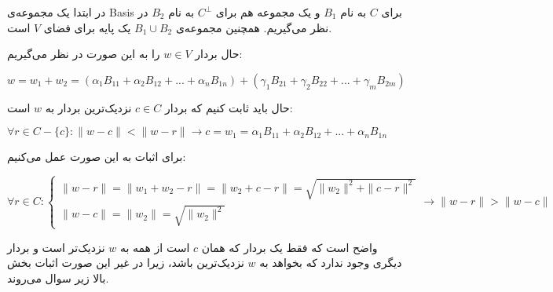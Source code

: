 در ابتدا یک مجموعه‌ی Basis برای $C$ به نام 
$B_1$
و یک مجموعه هم برای
$C^{\bot}$
به نام 
$B_2$
در نظر می‌گیریم. همچنین مجموعه‌ی 
$B_1 \cup B_2$
یک پایه برای فضای $V$ است.

حال بردار 
$w \in V$
را به این صورت در نظر می‌گیریم:

\setLTR

$w = w_1 + w_2 =( \alpha_1B_{11}+\alpha_2B_{12}+...+\alpha_nB_{1n}) + (\gamma_1B_{21} +\gamma_2B_{22}+ ...+\gamma_mB_{2m})$

\setRTL

حال باید ثابت کنیم که بردار 
$c \in C$
نزدیک‌‌‌ترین بردار به $w$ است:

\setLTR

$\forall r \in C - \{c\}: \|w-c\| < \|w-r\| \longrightarrow c = w_1 = \alpha_1B_{11}+\alpha_2B_{12}+...+\alpha_nB_{1n}$

\setRTL

برای اثبات به این صورت عمل می‌کنیم:

\setLTR

$
\forall r \in C:
\begin{cases}
	 \|w-r\| = \|w_1 + w_2 - r \| = \| w_2 + c - r \| = \sqrt{\|w_2\|^2 + \| c-r\|^2} \\
	\|w-c\| = \|w_2\| = \sqrt{\|w_2\|^2}
\end{cases}
\longrightarrow \|w-r\| > \|w-c\|
$

\setRTL

واضح است که فقط یک بردار که همان $c$ است از همه به $w$ نزدیک‌تر است و بردار دیگری وجود ندارد که بخواهد به $w$ نزدیک‌ترین باشد، زیرا در غیر این صورت اثبات بخش بالا زیر سوال می‌روند.


